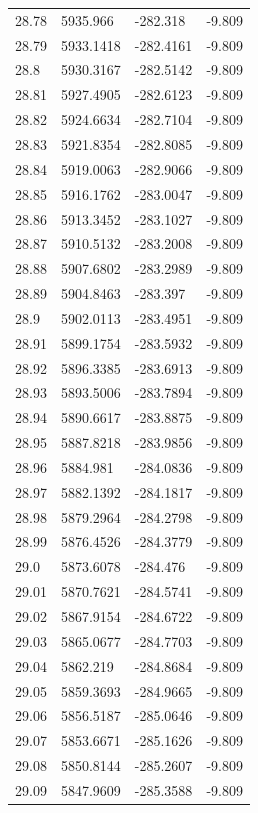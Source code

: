 \begin{table}[H]
\begin{tabular}{llll}
28.78 & 5935.966 & -282.318 & -9.809 \\
28.79 & 5933.1418 & -282.4161 & -9.809 \\
28.8 & 5930.3167 & -282.5142 & -9.809 \\
28.81 & 5927.4905 & -282.6123 & -9.809 \\
28.82 & 5924.6634 & -282.7104 & -9.809 \\
28.83 & 5921.8354 & -282.8085 & -9.809 \\
28.84 & 5919.0063 & -282.9066 & -9.809 \\
28.85 & 5916.1762 & -283.0047 & -9.809 \\
28.86 & 5913.3452 & -283.1027 & -9.809 \\
28.87 & 5910.5132 & -283.2008 & -9.809 \\
28.88 & 5907.6802 & -283.2989 & -9.809 \\
28.89 & 5904.8463 & -283.397 & -9.809 \\
28.9 & 5902.0113 & -283.4951 & -9.809 \\
28.91 & 5899.1754 & -283.5932 & -9.809 \\
28.92 & 5896.3385 & -283.6913 & -9.809 \\
28.93 & 5893.5006 & -283.7894 & -9.809 \\
28.94 & 5890.6617 & -283.8875 & -9.809 \\
28.95 & 5887.8218 & -283.9856 & -9.809 \\
28.96 & 5884.981 & -284.0836 & -9.809 \\
28.97 & 5882.1392 & -284.1817 & -9.809 \\
28.98 & 5879.2964 & -284.2798 & -9.809 \\
28.99 & 5876.4526 & -284.3779 & -9.809 \\
29.0 & 5873.6078 & -284.476 & -9.809 \\
29.01 & 5870.7621 & -284.5741 & -9.809 \\
29.02 & 5867.9154 & -284.6722 & -9.809 \\
29.03 & 5865.0677 & -284.7703 & -9.809 \\
29.04 & 5862.219 & -284.8684 & -9.809 \\
29.05 & 5859.3693 & -284.9665 & -9.809 \\
29.06 & 5856.5187 & -285.0646 & -9.809 \\
29.07 & 5853.6671 & -285.1626 & -9.809 \\
29.08 & 5850.8144 & -285.2607 & -9.809 \\
29.09 & 5847.9609 & -285.3588 & -9.809 \\

\end{tabular}
\end{table}
